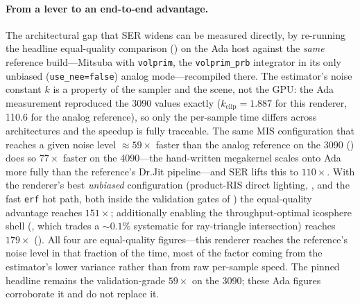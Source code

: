 \paragraph{From a lever to an end-to-end advantage.}
The architectural gap that SER widens can be measured directly, by re-running the headline equal-quality
comparison () on the Ada host against the \emph{same} reference build---Mitsuba
with \texttt{volprim}, the \texttt{volprim\_prb} integrator in its only unbiased (\texttt{use\_nee=false})
analog mode---recompiled there. The estimator's noise constant $k$ is a property of the sampler and the
scene, not the GPU: the Ada measurement reproduced the \num{3090} values exactly
($k_{\text{clip}}=\num{1.887}$ for this renderer, \num{110.6} for the analog reference), so only the
per-sample time differs across architectures and the speedup is fully traceable. The same MIS
configuration that reaches a given noise level $\approx\!59\times$ faster than the analog reference on the
\num{3090} () does so $77\times$ faster on the \num{4090}---the hand-written
megakernel scales onto Ada more fully than the reference's Dr.Jit pipeline---and SER lifts this to
$110\times$. With the renderer's best \emph{unbiased} configuration (product-RIS direct lighting,
, and the fast \texttt{erf} hot path, both inside the validation gates of
) the equal-quality advantage reaches $151\times$; additionally enabling the
throughput-optimal icosphere shell (, which trades a ${\sim}\num{0.1}\%$ systematic
for ray-triangle intersection) reaches $179\times$ (). All four are equal-quality
figures---this renderer reaches the reference's noise level in that fraction of the time, most of the
factor coming from the estimator's lower variance rather than from raw per-sample speed. The pinned
headline remains the validation-grade $59\times$ on the \num{3090}; these Ada figures corroborate it and
do not replace it.

